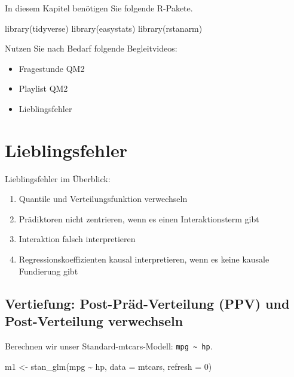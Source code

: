 \documentclass[
  ngerman,
  letterpaper,
  twoside,
  open=any]{scrbook}
\newenvironment{Shaded}{\begin{snugshade}}{\end{snugshade}}
\newcommand{\AttributeTok}[1]{\textcolor[rgb]{0.40,0.45,0.13}{#1}}
\newcommand{\DecValTok}[1]{\textcolor[rgb]{0.68,0.00,0.00}{#1}}
\newcommand{\FunctionTok}[1]{\textcolor[rgb]{0.28,0.35,0.67}{#1}}
\newcommand{\NormalTok}[1]{\textcolor[rgb]{0.00,0.23,0.31}{#1}}
\newcommand{\OtherTok}[1]{\textcolor[rgb]{0.00,0.23,0.31}{#1}}
\newcommand{\SpecialCharTok}[1]{\textcolor[rgb]{0.37,0.37,0.37}{#1}}
\providecommand{\tightlist}{%
  \setlength{\itemsep}{0pt}\setlength{\parskip}{0pt}}\usepackage{longtable,booktabs,array}
\theoremstyle{definition}
\theoremstyle{plain}
\theoremstyle{definition}
\theoremstyle{definition}
\theoremstyle{definition}
\theoremstyle{definition}
\theoremstyle{remark}
\begin{document}
In diesem Kapitel benötigen Sie folgende R-Pakete.

\begin{Shaded}
\begin{Highlighting}[]
\FunctionTok{library}\NormalTok{(tidyverse)}
\FunctionTok{library}\NormalTok{(easystats)}
\FunctionTok{library}\NormalTok{(rstanarm)}
\end{Highlighting}
\end{Shaded}

Nutzen Sie nach Bedarf folgende Begleitvideos:

\begin{itemize}
\tightlist
\item
  Fragestunde QM2
\item
  Playlist QM2
\item
  Lieblingsfehler
\end{itemize}

\section{Lieblingsfehler}\label{lieblingsfehler}

Lieblingsfehler im Überblick:

\begin{enumerate}
\def\labelenumi{\arabic{enumi}.}
\tightlist
\item
  Quantile und Verteilungsfunktion verwechseln
\item
  Prädiktoren nicht zentrieren, wenn es einen Interaktionsterm gibt
\item
  Interaktion falsch interpretieren
\item
  Regressionskoeffizienten kausal interpretieren, wenn es keine kausale
  Fundierung gibt
\end{enumerate}

\subsection{Vertiefung: Post-Präd-Verteilung (PPV) und Post-Verteilung
verwechseln}\label{vertiefung-post-pruxe4d-verteilung-ppv-und-post-verteilung-verwechseln}

Berechnen wir unser Standard-mtcars-Modell:
\texttt{mpg\ \textasciitilde{}\ hp}.

\begin{Shaded}
\begin{Highlighting}[]
\NormalTok{m1 }\OtherTok{\textless{}{-}} \FunctionTok{stan\_glm}\NormalTok{(mpg }\SpecialCharTok{\textasciitilde{}}\NormalTok{ hp, }\AttributeTok{data =}\NormalTok{ mtcars, }\AttributeTok{refresh =} \DecValTok{0}\NormalTok{)}
\end{Highlighting}
\end{Shaded}
\end{document}
